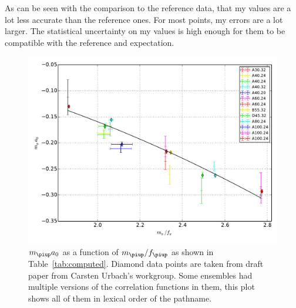 \documentclass[11pt, english, fleqn, DIV=10, headinclude]{scrartcl}
\newcommand\mpi{m_{\piup}}
\begin{document}
As can be seen with the comparison to the reference data, that my values are a
lot less accurate than the reference ones. For most points, my errors are a lot
larger. The statistical uncertainty on my values is high enough for them to be
compatible with the reference and expectation.

\begin{figure}[htbp]
    \centering
    \includegraphics[width=\linewidth]{plots/result.pdf}
    \caption{%
        $\mpi a_0$ as a function of $\mpi/f_\piup$ as shown in
        Table~\ref{tab:computed}. Diamond data points are taken from draft
        paper from Carsten Urbach's workgroup. Some ensembles had multiple
        versions of the correlation functions in them, this plot shows all of
        them in lexical order of the pathname.
    }
    \label{fig:result}
\end{figure}
\end{document}
